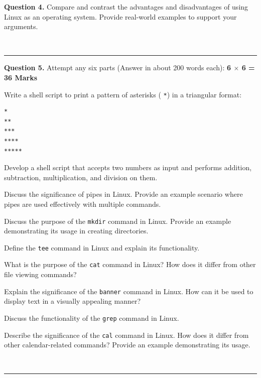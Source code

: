 \documentclass[11pt,a4paper]{article}
\begin{document}
\noindent   \textbf{Question 4.} Compare and contrast the advantages and disadvantages of using Linux as an operating system. Provide real-world examples to support your arguments.

\bigskip


\\[4pt]
\rule{\linewidth}{0.4pt}\smallskip




\noindent   \textbf{Question 5.} Attempt any six parts (Answer in about 200 words each): \hfill   \textbf{6 $ \times$ 6 = 36 Marks}

\begin{parts}
  \item Write a shell script to print a pattern of asterisks (   \texttt{*}) in a triangular format:

\begin{lstlisting}[language=bash]
*
**
***
****
*****
\end{lstlisting}
  \item Develop a shell script that accepts two numbers as input and performs addition, subtraction, multiplication, and division on them.
  \item Discuss the significance of pipes in Linux. Provide an example scenario where pipes are used effectively with multiple commands.
  \item Discuss the purpose of the   \texttt{mkdir} command in Linux. Provide an example demonstrating its usage in creating directories.
  \item Define the   \texttt{tee} command in Linux and explain its functionality.
  \item What is the purpose of the   \texttt{cat} command in Linux? How does it differ from other file viewing commands?
  \item Explain the significance of the   \texttt{banner} command in Linux. How can it be used to display text in a visually appealing manner?
  \item Discuss the functionality of the   \texttt{grep} command in Linux.
  \item Describe the significance of the   \texttt{cal} command in Linux. How does it differ from other calendar-related commands? Provide an example demonstrating its usage.
\end{parts}

\bigskip


\\[4pt]
\rule{\linewidth}{0.4pt}\smallskip
\end{document}
